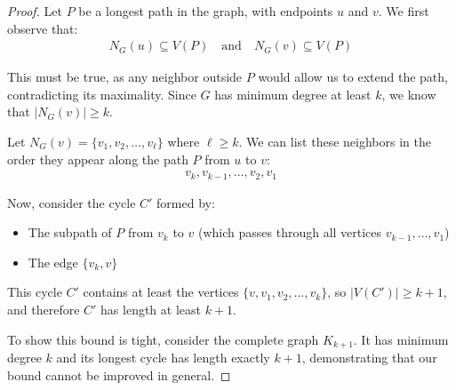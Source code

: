 \documentclass{article}
\theoremstyle{definition}
\begin{document}
\begin{proof}
    Let $P$ be a longest path in the graph, with endpoints $u$ and $v$. We first observe that:
    \begin{align}
        N_G(u) \subseteq V(P) \quad \text{and} \quad N_G(v) \subseteq V(P)
    \end{align}
    
    This must be true, as any neighbor outside $P$ would allow us to extend the path, contradicting its maximality. Since $G$ has minimum degree at least $k$, we know that $|N_G(v)| \geq k$.
    
    Let $N_G(v) = \{v_1, v_2, \ldots, v_\ell\}$ where $\ell \geq k$. We can list these neighbors in the order they appear along the path $P$ from $u$ to $v$:
    \begin{align}
        v_k, v_{k-1}, \ldots, v_2, v_1
    \end{align}
    
    Now, consider the cycle $C'$ formed by:
    \begin{itemize}
        \item The subpath of $P$ from $v_k$ to $v$ (which passes through all vertices $v_{k-1}, \ldots, v_1$)
        \item The edge $\{v_k, v\}$
    \end{itemize}
    
    This cycle $C'$ contains at least the vertices $\{v, v_1, v_2, \ldots, v_k\}$, so $|V(C')| \geq k + 1$, and therefore $C'$ has length at least $k + 1$.
    
    To show this bound is tight, consider the complete graph $K_{k+1}$. It has minimum degree $k$ and its longest cycle has length exactly $k+1$, demonstrating that our bound cannot be improved in general.
\end{proof}
\end{document}
